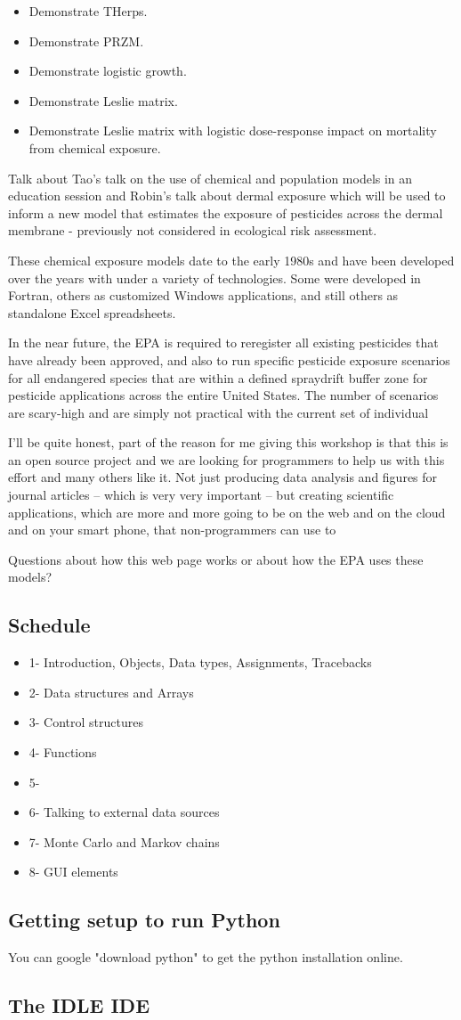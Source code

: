 \documentclass[12pt, A4]{article}
\begin{document}
\begin{itemize}
\item Demonstrate THerps.  
\item Demonstrate PRZM.
\item Demonstrate logistic growth. 
\item Demonstrate Leslie matrix.  
\item Demonstrate Leslie matrix with logistic dose-response impact on mortality from chemical exposure.
\end{itemize}

Talk about Tao's talk on the use of chemical and population models in an education session and Robin's talk about dermal exposure which will be used to inform a new model that estimates the exposure of pesticides across the dermal membrane - previously not considered in ecological risk assessment.

These chemical exposure models date to the early 1980s and have been developed over the years with under a variety of technologies.  Some were developed in Fortran, others as customized Windows applications, and still others as standalone Excel spreadsheets.

In the near future, the EPA is required to reregister all existing pesticides that have already been approved, and also to run specific pesticide exposure scenarios for all endangered species that are within a defined spraydrift buffer zone for pesticide applications across the entire United States.  The number of scenarios are scary-high and are simply not practical with the current set of individual

I'll be quite honest, part of the reason for me giving this workshop is that this is an open source project and we are looking for programmers to help us with this effort and many others like it.  Not just producing data analysis and figures for journal articles -- which is very very important -- but creating scientific applications, which are more and more going to be on the web and on the cloud and on your smart phone, that non-programmers can use to

Questions about how this web page works or about how the EPA uses these models?

\subsection{Schedule}
\begin{itemize}
\item 1- Introduction, Objects, Data types, Assignments, Tracebacks
\item 2- Data structures and Arrays
\item 3- Control structures
\item 4- Functions
\item 5- 
\item 6- Talking to external data sources
\item 7- Monte Carlo and Markov chains
\item 8- GUI elements
\end{itemize}

\subsection{Getting setup to run Python}
You can google "download python" to get the python installation online.
\subsection{The IDLE IDE}
\end{document}
